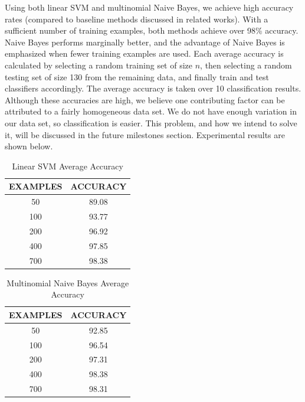 \documentclass{article} %
\begin{document}
Using both linear SVM and multinomial Naive Bayes, we achieve high accuracy rates (compared to baseline methods discussed in related works). With a sufficient number of training examples, both methods achieve over 98\% accuracy. Naive Bayes performs marginally better, and the advantage of Naive Bayes is emphasized when fewer training examples are used. Each average accuracy is calculated by selecting a random training set of size $n$, then selecting a random testing set of size 130 from the remaining data, and finally train and test classifiers accordingly. The average accuracy is taken over 10 classification results. Although these accuracies are high, we believe one contributing factor can be attributed to a fairly homogeneous data set. We do not have enough variation in our data set, so classification is easier. This problem, and how we intend to solve it, will be discussed in the future milestones section. Experimental results are shown below.

\begin{table}[hp]
\caption{Linear SVM Average Accuracy}
\begin{center}
\begin{tabular}{c|c}
{\bf EXAMPLES}  &{\bf ACCURACY}
\\ \hline
50              &89.08 \\
100             &93.77 \\
200             &96.92 \\
400             &97.85 \\
700             &98.38 \\
\end{tabular}
\end{center}
\end{table}

\begin{table}[hp]
\caption{Multinomial Naive Bayes Average Accuracy}
\begin{center}
\begin{tabular}{c|c}
{\bf EXAMPLES}  &{\bf ACCURACY}
\\ \hline 
50              &92.85 \\
100             &96.54 \\
200             &97.31 \\
400             &98.38 \\
700             &98.31 \\
\end{tabular}
\end{center}
\end{table}
\end{document}
